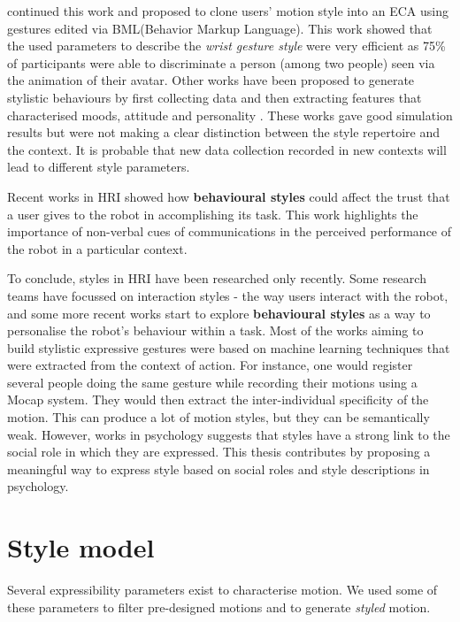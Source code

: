 \documentclass[a4paper,twocolumn]{svjour3}
\begin{document}
\cite{Rajagopal2012} continued this work and proposed to clone users' motion style into an ECA using gestures edited via BML(Behavior Markup Language).
This work showed that the used parameters to describe the \textit{wrist gesture style} were very efficient as 75\% of participants were able to discriminate a person (among two people) seen via the animation of their avatar.
Other works have been proposed to generate stylistic behaviours by first collecting data and then extracting features that characterised moods, attitude and personality \cite{Kang2013a,Czy2009}. 
These works gave good simulation results but were not making a clear distinction between the style repertoire and the context. 
It is probable that new data collection recorded in new contexts will lead to different style parameters.

Recent works in HRI showed how \textbf{behavioural styles} \cite{Ligthart2013,VandenBrule2014} could affect the trust that a user gives to the robot in accomplishing its task. 
This work highlights the importance of non-verbal cues of communications in the perceived performance of the robot in a particular context. 


To conclude, styles in HRI have been researched only recently. 
Some research teams have focussed on interaction styles - the way users interact with the robot, and some more recent works start to explore \textbf{behavioural styles} as a way to personalise the robot's behaviour within a task. 
Most of the works aiming to build stylistic expressive gestures were based on machine learning techniques that were extracted from the context of action. 
For instance, one would register several people doing the same gesture while recording their motions using a Mocap system.
They would then extract the inter-individual specificity of the motion.
This can produce a lot of motion styles, but they can be semantically weak.
However, works in psychology suggests that styles have a strong link to the social role in which they are expressed. 
This thesis contributes by proposing a meaningful way to express style based on social roles and style descriptions in psychology.

\section{Style model}
Several expressibility parameters exist to characterise motion. 
We used some of these parameters to filter pre-designed motions and to generate \textit{styled} motion.
\end{document}
